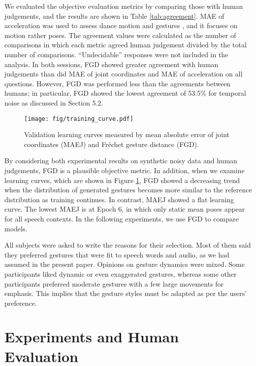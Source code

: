 \documentclass[acmtog]{acmart}
\begin{document}
We evaluated the objective evaluation metrics by comparing those with human judgements, and the results are shown in Table \ref{tab:agreement}. MAE of acceleration was used to assess dance motion \cite{aristidou2015folk} and gestures \cite{kucherenko2019analyzing}, and it focuses on motion rather poses. The agreement values were calculated as the number of comparisons in which each metric agreed human judgement divided by the total number of comparisons. ``Undecidable'' responses were not included in the analysis. In both sessions, FGD showed greater agreement with human judgements than did MAE of joint coordinates and MAE of acceleration on all questions. However, FGD was performed less than the agreements between humans; in particular, FGD showed the lowest agreement of 53.5\% for temporal noise as discussed in Section 5.2. 

\begin{figure}
  \centering
  \texttt{[image: fig/training\_curve.pdf]}
  \caption{Validation learning curves measured by mean absolute error of joint coordinates (MAEJ) and Fr\'{e}chet gesture distance (FGD).}
  \label{fig:train_curve}
\end{figure}

By considering both experimental results on synthetic noisy data and human judgements, FGD is a plausible objective metric. In addition, when we examine learning curves, which are shown in Figure \ref{fig:train_curve}, FGD showed a decreasing trend when the distribution of generated gestures becomes more similar to the reference distribution as training continues. In contrast, MAEJ showed a flat learning curve. The lowest MAEJ is at Epoch 6, in which only static mean poses appear for all speech contexts. In the following experiments, we use FGD to compare models.

All subjects were asked to write the reasons for their selection. Most of them said they preferred gestures that were fit to speech words and audio, as we had assumed in the present paper. Opinions on gesture dynamics were mixed. Some participants liked dynamic or even exaggerated gestures, whereas some other participants preferred moderate gestures with a few large movements for emphasis. This implies that the gesture styles must be adapted as per the users' preference. \section{Experiments and Human Evaluation} \label{sec:experiment}
\end{document}
